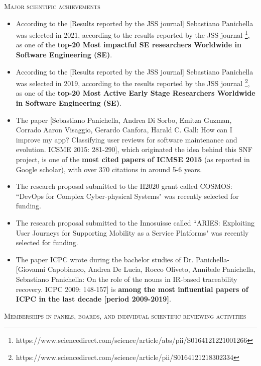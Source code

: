 \documentclass[12pt]{article}
\begin{document}
\vspace{6.5mm}

\textsc{Major scientific achievements}

\vspace{-2.5mm}
\begin{itemize}
  \item According to the [Results reported by the JSS journal] Sebastiano Panichella was selected in 2021, according to the results reported by the JSS journal \footnote{https://www.sciencedirect.com/science/article/abs/pii/S0164121221001266}, as one of the \textbf{top-20 Most impactful SE researchers Worldwide in Software Engineering (SE)}. 
  \item According to the [Results reported by the JSS journal] Sebastiano Panichella was selected in 2019, according to the results reported by the JSS journal \footnote{https://www.sciencedirect.com/science/article/pii/S0164121218302334}, as one of the \textbf{top-20 Most Active Early Stage Researchers Worldwide in Software Engineering (SE)}. 
\vspace{-1.5mm}
  \item The paper [Sebastiano Panichella, Andrea Di Sorbo, Emitza Guzman, Corrado Aaron Visaggio, Gerardo Canfora, Harald C. Gall: How can I improve my app? Classifying user reviews for software maintenance and evolution. ICSME 2015: 281-290], which originated the idea behind this SNF project, is one of the \textbf{most cited papers of ICMSE 2015} (as reported in Google scholar), with over 370 citations in around 5-6 years.
  \item The research proposal submitted to the H2020 grant called COSMOS: ``DevOps for Complex Cyber-physical Systems" was recently selected for funding.
  \item The research proposal submitted to the Innosuisse called ``ARIES: Exploiting User Journeys for Supporting Mobility as a Service Platforms" was recently selected for funding.
\vspace{-1.5mm}
  \item The paper ICPC wrote during the bachelor studies of Dr. Panichella-[Giovanni Capobianco, Andrea De Lucia, Rocco Oliveto, Annibale Panichella, Sebastiano Panichella: On the role of the nouns in IR-based traceability recovery. ICPC 2009: 148-157] is \textbf{among the most influential papers of ICPC in the last decade [period 2009-2019]}.
  \vspace{-1.5mm}
\end{itemize}

\textsc{Memberships in panels, boards, and individual scientific reviewing activities}
\end{document}
